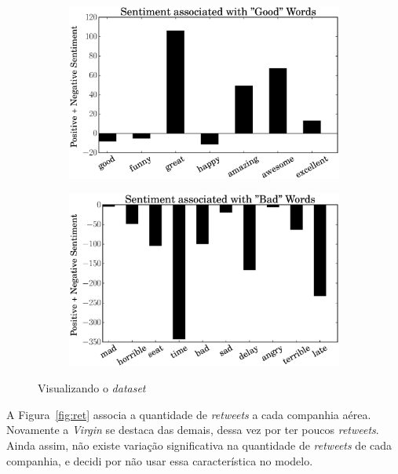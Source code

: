 \documentclass[a4paper, 12pt]{article}
\begin{document}
\begin{figure}[htpb]
\begin{subfigure}[htpb]{0.45\textwidth}
        \includegraphics[width=\textwidth]{airline_good_words}
        \caption{}
        \label{fig:gwd}
    \end{subfigure}
    \begin{subfigure}[htpb]{0.45\textwidth}
        \includegraphics[width=\textwidth]{airline_bad_words}
        \caption{}
        \label{fig:bwd}
    \end{subfigure}
    \caption{Visualizando o \textit{dataset}}\label{fig:viz}
\end{figure}

A Figura~\ref{fig:ret} associa a quantidade de \textit{retweets}
a cada companhia aérea. Novamente a \textit{Virgin} se destaca
das demais, dessa vez por ter poucos \textit{retweets}. Ainda assim,
não existe variação significativa na quantidade de \textit{retweets}
de cada companhia, e decidi por não usar essa característica no modelo.
\end{document}
